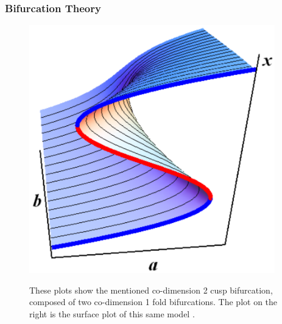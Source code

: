 \documentclass[10pt]{beamer}
\newcommand\TwoFigOneCap[4]{%
	\begin{figure}[hbt]
		\minipage[t]{0.48\textwidth}\centering
			{#1}
		\endminipage\hfill
		\minipage[t]{0.48\textwidth}\centering
			{#2}
		\endminipage
		\caption{#3}\label{#4}
	\end{figure}%
}
\begin{document}
\begin{frame} %
\frametitle{Bifurcation Theory}

\TwoFigOneCap{}
	{\includegraphics[width=0.95\textwidth]{../Graphics/Bif_Graphs/Bif_3D.png}}
	{These plots show the mentioned co-dimension 2 cusp bifurcation, composed of two co-dimension 1 fold bifurcations.
	The plot on the right is the surface plot of this same model \parencite{weymiens_bifurcation_2014}.}
	{fig:Bif_hysteresis}

\end{frame}

\end{document}
